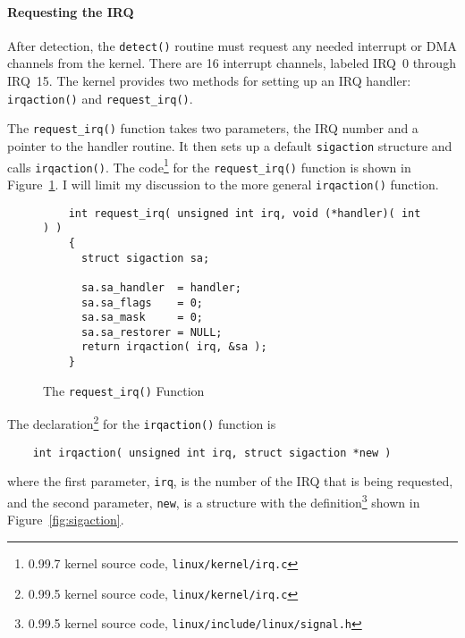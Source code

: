 \paragraph{Requesting the IRQ}

After detection, the \verb|detect()| routine must request any needed
interrupt or DMA channels from the kernel.  There are 16 interrupt
channels, labeled IRQ~0 through IRQ~15\@.  The kernel provides two methods
for setting up an IRQ handler: \verb|irqaction()| and \verb|request_irq()|.

The \verb|request_irq()| function takes two parameters, the IRQ number and
a pointer to the handler routine.  It then sets up a default
\verb|sigaction| structure and calls \verb|irqaction()|.  The
code\footnote{\Linux{} 0.99.7 kernel source code,
  \verb|linux/kernel/irq.c|} for the \verb|request_irq()| function is shown
in Figure~\ref{fig:request.irq}.  I will limit my discussion to the more
general \verb|irqaction()| function.

\begin{figure}[hbtp]
  \leavevmode
  \begin{center}
    \begin{verbatim}
    int request_irq( unsigned int irq, void (*handler)( int ) )
    {
      struct sigaction sa;
    
      sa.sa_handler  = handler;
      sa.sa_flags    = 0;
      sa.sa_mask     = 0;
      sa.sa_restorer = NULL;
      return irqaction( irq, &sa );
    }
    \end{verbatim}
    \caption{The {\tt request\_irq()} Function}
    \label{fig:request.irq}
  \end{center}
\end{figure}


The declaration\footnote{\Linux{} 0.99.5 kernel source code,
  \verb|linux/kernel/irq.c|} for the \verb|irqaction()| function is
\begin{singlespace}
  \begin{center}
    \begin{verbatim}
    int irqaction( unsigned int irq, struct sigaction *new )
    \end{verbatim}
  \end{center}
\end{singlespace}
\noindent where the first parameter, \verb|irq|, is the number of the IRQ
that is being requested, and the second parameter, \verb|new|, is a
structure with the definition\footnote{\Linux{} 0.99.5 kernel source code,
  \verb|linux/include/linux/signal.h|} shown in Figure~\ref{fig:sigaction}.

